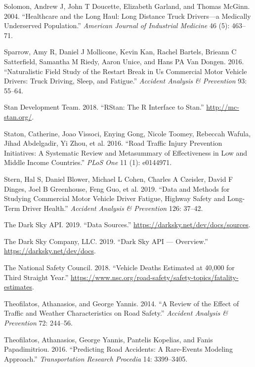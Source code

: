 \documentclass[12pt]{book}
\numberwithin{equation}{chapter}
\begin{document}
\leavevmode\hypertarget{ref-solomon2004healthcare}{}%
Solomon, Andrew J, John T Doucette, Elizabeth Garland, and Thomas McGinn. 2004. ``Healthcare and the Long Haul: Long Distance Truck Drivers---a Medically Underserved Population.'' \emph{American Journal of Industrial Medicine} 46 (5): 463--71.

\leavevmode\hypertarget{ref-sparrow2016naturalistic}{}%
Sparrow, Amy R, Daniel J Mollicone, Kevin Kan, Rachel Bartels, Brieann C Satterfield, Samantha M Riedy, Aaron Unice, and Hans PA Van Dongen. 2016. ``Naturalistic Field Study of the Restart Break in Us Commercial Motor Vehicle Drivers: Truck Driving, Sleep, and Fatigue.'' \emph{Accident Analysis \& Prevention} 93: 55--64.

\leavevmode\hypertarget{ref-rstancitation}{}%
Stan Development Team. 2018. ``RStan: The R Interface to Stan.'' \url{http://mc-stan.org/}.

\leavevmode\hypertarget{ref-staton2016road}{}%
Staton, Catherine, Joao Vissoci, Enying Gong, Nicole Toomey, Rebeccah Wafula, Jihad Abdelgadir, Yi Zhou, et al. 2016. ``Road Traffic Injury Prevention Initiatives: A Systematic Review and Metasummary of Effectiveness in Low and Middle Income Countries.'' \emph{PLoS One} 11 (1): e0144971.

\leavevmode\hypertarget{ref-stern2019data}{}%
Stern, Hal S, Daniel Blower, Michael L Cohen, Charles A Czeisler, David F Dinges, Joel B Greenhouse, Feng Guo, et al. 2019. ``Data and Methods for Studying Commercial Motor Vehicle Driver Fatigue, Highway Safety and Long-Term Driver Health.'' \emph{Accident Analysis \& Prevention} 126: 37--42.

\leavevmode\hypertarget{ref-darkskyds}{}%
The Dark Sky API. 2019. ``Data Sources.'' \url{https://darksky.net/dev/docs/sources}.

\leavevmode\hypertarget{ref-darksky}{}%
The Dark Sky Company, LLC. 2019. ``Dark Sky API --- Overview.'' \url{https://darksky.net/dev/docs}.

\leavevmode\hypertarget{ref-nsc2018}{}%
The National Safety Council. 2018. ``Vehicle Deaths Estimated at 40,000 for Third Straight Year.'' \url{https://www.nsc.org/road-safety/safety-topics/fatality-estimates}.

\leavevmode\hypertarget{ref-theofilatos2014review}{}%
Theofilatos, Athanasios, and George Yannis. 2014. ``A Review of the Effect of Traffic and Weather Characteristics on Road Safety.'' \emph{Accident Analysis \& Prevention} 72: 244--56.

\leavevmode\hypertarget{ref-theofilatos2016predicting}{}%
Theofilatos, Athanasios, George Yannis, Pantelis Kopelias, and Fanis Papadimitriou. 2016. ``Predicting Road Accidents: A Rare-Events Modeling Approach.'' \emph{Transportation Research Procedia} 14: 3399--3405.
\end{document}
